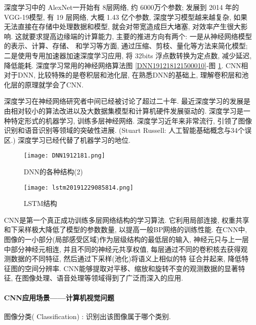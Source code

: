 深度学习中的 AlexNet一开始有 8层网络, 约 6000万个参数; 发展到 2014 年的 VGG-19模型, 有 19 层网络, 大概 1.43 亿个参数, 深度学习模型越来越复杂, 如果无法直接在存储中处理数据和模型, 就会对带宽造成巨大堵塞, 对效率产生很大影响.
这就要求提高边缘端的计算能力, 主要的推进方向有两个:  一是从神经网络模型的表示、计算、存储、 和学习等方面, 通过压缩、剪枝、量化等方法来简化模型;  二是使用专用加速器加速深度学习应用, 将 32bits 浮点数转换为定点数, 减少延迟, 降低能耗.
深度学习常用的神经网络算法图  \ref{DNN191218121500010}-图  \ref{DNN191218121500011}. 
CNN相对于DNN, 比较特殊的是卷积层和池化层, 在熟悉DNN的基础上, 理解卷积层和池化层的原理就学会了CNN.

深度学习在神经网络研究者中间已经被讨论了超过二十年. 最近深度学习的发展是由相对较小的算法改进以及大数据集模型和计算机硬件发展驱动的.
深度学习是一种特定形式的机器学习, 训练多层神经网络. 深度学习近年来非常流行, 引领了图像识别和语音识别等领域的突破性进展. (Stuart Russell: 人工智能基础概念与34个误区.)
深度学习已经代替了机器学习的地位.
\begin{figure}[H]
    \centering
    \texttt{[image: DNN1912181.png]}
    \caption{DNN的各种结构(2)}
    \label{DNN191218121500011}
    \vspace{-0.4cm}
\end{figure}
\begin{figure}[H]
    \centering
    \texttt{[image: lstm20191229085814.png]}
    \caption{LSTM结构}
    \label{lstm20191229085814}
    \vspace{-0.4cm}
\end{figure}
CNN是第一个真正成功训练多层网络结构的学习算法. 它利用局部连接, 权重共享和下采样极大降低了模型的参数数量, 以提高一般BP网络的训练性能.
在CNN中, 图像的一小部分(局部感受区域)作为层级结构的最低层的输入, 神经元只与上一层中部分神经元相连, 并且不同的神经元共享权值, 每层通过不同的卷积核去获得观测数据的不同特征, 然后通过下采样(池化)将语义上相似的特
征合并起来, 降低特征图的空间分辨率.  CNN能够提取对平移、缩放和旋转不变的观测数据的显著特征, 在图像处理、语音处理等领域得到了广泛而深入的应用.
\paragraph{CNN应用场景——计算机视觉问题}

 图像分类( Classification) : 识别出该图像属于哪个类别.

